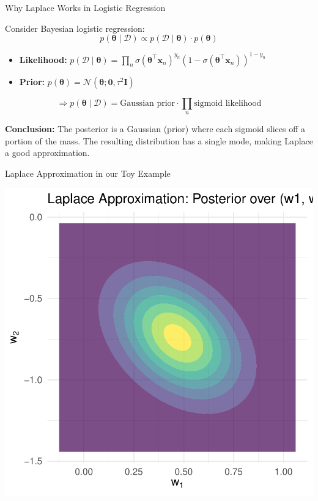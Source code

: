 \documentclass{beamer}
\begin{document}
\begin{frame}{Why Laplace Works in Logistic Regression}

Consider Bayesian logistic regression:
\[
p(\boldsymbol{\theta} \mid \mathcal{D}) \propto p(\mathcal{D} \mid \boldsymbol{\theta}) \cdot p(\boldsymbol{\theta})
\]

\medskip

\begin{itemize}
  \item \textbf{Likelihood:} \(p(\mathcal{D} \mid \boldsymbol{\theta}) = \prod_{n} \sigma(\boldsymbol{\theta}^\top \mathbf{x}_n)^{y_n}(1 - \sigma(\boldsymbol{\theta}^\top \mathbf{x}_n))^{1 - y_n}\)
  \item \textbf{Prior:} \(p(\boldsymbol{\theta}) = \mathcal{N}(\boldsymbol{\theta}; \mathbf{0}, \tau^2 \mathbf{I})\)
\end{itemize}

\medskip

\[
\Rightarrow p(\boldsymbol{\theta} \mid \mathcal{D}) = \text{Gaussian prior} \cdot \prod_n \text{sigmoid likelihood}
\]

\medskip

\textbf{Conclusion:} The posterior is a Gaussian (prior) where each sigmoid slices off a portion of the mass. The resulting distribution has a single mode, making Laplace a good approximation.

\end{frame}

\begin{frame}{Laplace Approximation in our Toy Example}

\begin{center}
  \includegraphics[width=0.6\linewidth]{laplace_posterior_contours.pdf}
\end{center}

\end{frame}
\end{document}
